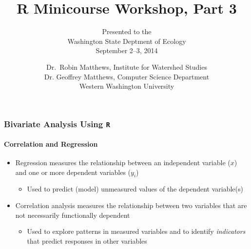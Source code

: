\documentclass[10pt]{beamer}
\title{R Minicourse Workshop, Part 3}
\author{\small Presented to the\\
        Washington State Deptment of Ecology\\
       September 2--3, 2014}
\date{\scriptsize Dr.~Robin Matthews, Institute for Watershed Studies\\
   Dr. Geoffrey Matthews, Computer Science Department\\
   Western Washington University}
\begin{document}
\newcommand{\be}{\begin{enumerate}}
\newcommand{\ee}{\end{enumerate}}
\newcommand{\bi}{\begin{itemize}}
\newcommand{\ei}{\end{itemize}}
\newcommand{\bd}{\begin{description}}
\newcommand{\ed}{\end{description}}


\begin{frame}
\titlepage
\end{frame}

\begin{frame}
\frametitle{Bivariate Analysis Using {\color{red} \tt R}}
\framesubtitle{Correlation and Regression}

\bi
\item Regression measures the relationship between an independent
  variable ($x$) and one or more dependent variables ($y_{i}$)

\bi
\item Used to predict (model) unmeasured values of the dependent
  variable(s)
\ei

\item Correlation analysis measures the relationship between two
  variables that are not necessarily functionally dependent

\bi
\item Used to explore patterns in measured variables and to identify
  {\em indicators} that predict responses in other variables
\ei
\ei

\end{frame}
\end{document}

